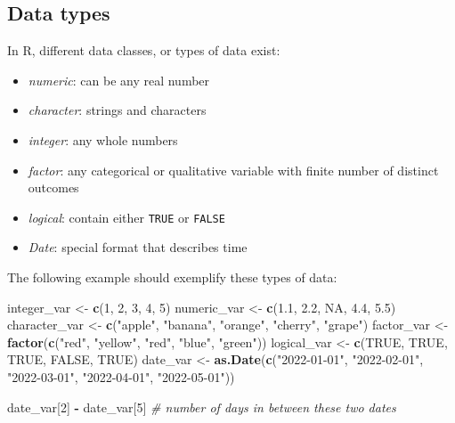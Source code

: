 \documentclass[
  12pt,
  oneside]{book}
\newenvironment{Shaded}{\begin{snugshade}}{\end{snugshade}}
\newcommand{\CommentTok}[1]{\textcolor[rgb]{0.56,0.35,0.01}{\textit{#1}}}
\newcommand{\ConstantTok}[1]{\textcolor[rgb]{0.56,0.35,0.01}{#1}}
\newcommand{\DecValTok}[1]{\textcolor[rgb]{0.00,0.00,0.81}{#1}}
\newcommand{\FloatTok}[1]{\textcolor[rgb]{0.00,0.00,0.81}{#1}}
\newcommand{\FunctionTok}[1]{\textcolor[rgb]{0.13,0.29,0.53}{\textbf{#1}}}
\newcommand{\NormalTok}[1]{#1}
\newcommand{\OtherTok}[1]{\textcolor[rgb]{0.56,0.35,0.01}{#1}}
\newcommand{\SpecialCharTok}[1]{\textcolor[rgb]{0.81,0.36,0.00}{\textbf{#1}}}
\newcommand{\StringTok}[1]{\textcolor[rgb]{0.31,0.60,0.02}{#1}}
\providecommand{\tightlist}{%
  \setlength{\itemsep}{0pt}\setlength{\parskip}{0pt}}
\begin{document}
\hypertarget{data-types}{%
\subsection{Data types}\label{data-types}}

In R, different data classes, or types of data exist:

\begin{itemize}
\tightlist
\item
  \emph{numeric}: can be any real number
\item
  \emph{character}: strings and characters
\item
  \emph{integer}: any whole numbers
\item
  \emph{factor}: any categorical or qualitative variable with finite number of distinct outcomes
\item
  \emph{logical}: contain either \texttt{TRUE} or \texttt{FALSE}
\item
  \emph{Date}: special format that describes time
\end{itemize}

The following example should exemplify these types of data:

\begin{Shaded}
\begin{Highlighting}[]
\NormalTok{integer\_var }\OtherTok{\textless{}{-}} \FunctionTok{c}\NormalTok{(}\DecValTok{1}\NormalTok{, }\DecValTok{2}\NormalTok{, }\DecValTok{3}\NormalTok{, }\DecValTok{4}\NormalTok{, }\DecValTok{5}\NormalTok{)}
\NormalTok{numeric\_var }\OtherTok{\textless{}{-}} \FunctionTok{c}\NormalTok{(}\FloatTok{1.1}\NormalTok{, }\FloatTok{2.2}\NormalTok{, }\ConstantTok{NA}\NormalTok{, }\FloatTok{4.4}\NormalTok{, }\FloatTok{5.5}\NormalTok{)}
\NormalTok{character\_var }\OtherTok{\textless{}{-}} \FunctionTok{c}\NormalTok{(}\StringTok{"apple"}\NormalTok{, }\StringTok{"banana"}\NormalTok{, }\StringTok{"orange"}\NormalTok{, }\StringTok{"cherry"}\NormalTok{, }\StringTok{"grape"}\NormalTok{)}
\NormalTok{factor\_var }\OtherTok{\textless{}{-}} \FunctionTok{factor}\NormalTok{(}\FunctionTok{c}\NormalTok{(}\StringTok{"red"}\NormalTok{, }\StringTok{"yellow"}\NormalTok{, }\StringTok{"red"}\NormalTok{, }\StringTok{"blue"}\NormalTok{, }\StringTok{"green"}\NormalTok{))}
\NormalTok{logical\_var }\OtherTok{\textless{}{-}} \FunctionTok{c}\NormalTok{(}\ConstantTok{TRUE}\NormalTok{, }\ConstantTok{TRUE}\NormalTok{, }\ConstantTok{TRUE}\NormalTok{, }\ConstantTok{FALSE}\NormalTok{, }\ConstantTok{TRUE}\NormalTok{)}
\NormalTok{date\_var }\OtherTok{\textless{}{-}} \FunctionTok{as.Date}\NormalTok{(}\FunctionTok{c}\NormalTok{(}\StringTok{"2022{-}01{-}01"}\NormalTok{, }\StringTok{"2022{-}02{-}01"}\NormalTok{, }\StringTok{"2022{-}03{-}01"}\NormalTok{, }\StringTok{"2022{-}04{-}01"}\NormalTok{, }\StringTok{"2022{-}05{-}01"}\NormalTok{))}

\NormalTok{date\_var[}\DecValTok{2}\NormalTok{] }\SpecialCharTok{{-}}\NormalTok{ date\_var[}\DecValTok{5}\NormalTok{] }\CommentTok{\# number of days in between these two dates}
\end{Highlighting}
\end{Shaded}
\end{document}
